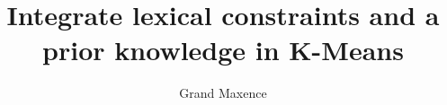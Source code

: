 \documentclass[twocolumn]{svjour3}       %
\begin{document}
\title{Integrate lexical constraints and a prior knowledge in K-Means}
\author{Grand Maxence}






\nocite{*}
\printbibliography[title=References]
\end{document}
